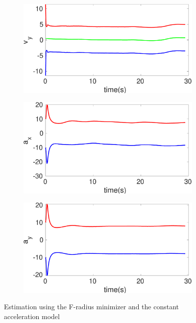 \begin{figure}[h]
\begin{subfigure}{.5\linewidth}
\end{subfigure}
\begin{subfigure}{.5\linewidth}
\centering
\includegraphics[width=\linewidth]{figures/Frad/s3caSMv_y}
\end{subfigure}
\begin{subfigure}{.5\linewidth}
\centering
\includegraphics[width=\linewidth]{figures/Frad/s3caSMa_x}
\end{subfigure}
\begin{subfigure}{.5\linewidth}
\centering
\includegraphics[width=\linewidth]{figures/Frad/s3caSMa_y}
\end{subfigure}
\caption{Estimation using the F-radius minimizer and the constant acceleration model}
\end{figure}

